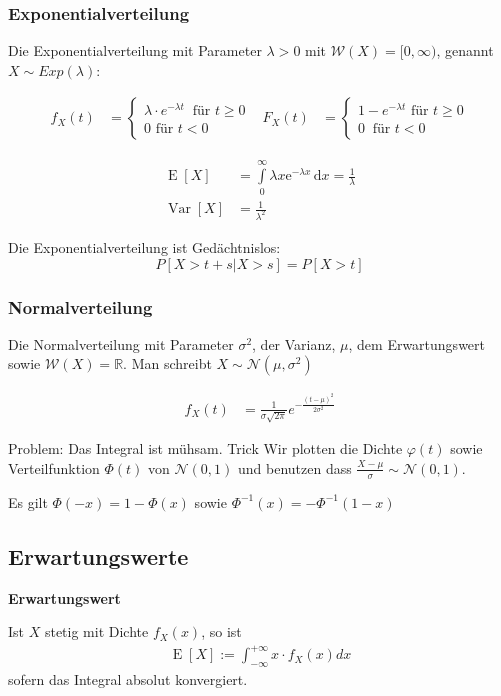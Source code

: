 \documentclass[25pt]{sciposter}
\newcommand{\R}{\mathbb{R}}
\newcommand{\W}{\mathcal{W}}
\newcommand{\Nor}{\mathcal{N}}
\newcommand{\Var}{\operatorname{Var}}
\newcommand{\E}{\operatorname{E}}
\newenvironment{method}[1]{\begin{mdframed}[backgroundcolor=blue!10,innertopmargin=15pt, innerbottommargin=15pt,nobreak=true]
		\textbf{#1 }
	}
	{ 
	\end{mdframed}
}
\begin{document}
\begin{multicols}{3}
\subsubsection*{Exponentialverteilung}
Die Exponentialverteilung mit Parameter $\lambda > 0$ mit $\W(X)=[0,\infty)$, genannt $X\sim Exp(\lambda)$:

\begin{align*}
f_X(t) &= \begin{cases}
\lambda \cdot e^{-\lambda t} \ \text{ für } t \geq 0\\
0 \text{ für } t < 0
\end{cases}
& 
F_X(t) &= \begin{cases}
1-e^{-\lambda t} \text{ für } t\geq 0\\
0 \ \text{ für } t < 0
\end{cases}
\end{align*}

\begin{align*}
	\E[X]&=\int \limits _{0}^{\infty }\lambda x{\mathrm  {e}}^{{-\lambda x}}\,{\mathrm  {d}}x={\frac  {1}{\lambda }}\\
	\Var[X] &= \frac{1}{\lambda^2}
\end{align*}

Die Exponentialverteilung ist Gedächtnislos: 
$$P[X > t+s| X > s] = P[X > t]$$


\subsubsection*{Normalverteilung}
Die Normalverteilung mit Parameter $\sigma^2$, der Varianz, $\mu$, dem Erwartungswert sowie $\W(X) = \R$. Man schreibt $X\sim \Nor(\mu,\sigma^2)$

\begin{align*}
f_X(t) &= \frac{1}{\sigma\sqrt{2\pi}}e^{-\frac{(t-\mu)^2}{2\sigma^2}}
\end{align*}

Problem: Das Integral ist mühsam. Trick Wir plotten die Dichte $\varphi(t)$ sowie Verteilfunktion $\Phi(t)$ von $\Nor(0,1)$ und benutzen dass $\frac{X-\mu}{\sigma} \sim \Nor(0,1)$.

Es gilt $\Phi(-x) = 1 - \Phi(x)$ sowie ${\Phi^{-1}(x) = -\Phi^{-1}(1-x)}$


\subsection*{Erwartungswerte}

\begin{method}{Erwartungswert}
	Ist $X$ stetig mit Dichte $f_X(x)$, so ist
	\begin{align*}
		\E[X]:= \int_{-\infty}^{+\infty} x\cdot f_X(x) dx
	\end{align*}
	sofern das Integral absolut konvergiert.
\end{method}


\end{multicols}
\end{document}
